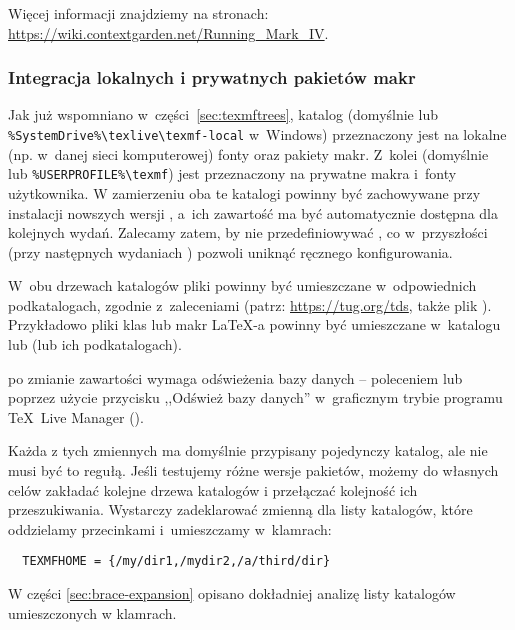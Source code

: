 \documentclass{article}
\begin{document}
Więcej informacji znajdziemy na stronach:
\url{https://wiki.contextgarden.net/Running_Mark_IV}.

\subsubsection{Integracja lokalnych i prywatnych pakietów makr}
\label{sec:local-personal-macros}

Jak już wspomniano w~części~\ref{sec:texmftrees}, katalog 
(domyślnie  lub
\verb|%SystemDrive%\texlive\texmf-local| w~Windows) przeznaczony jest na lokalne
(np. w~danej sieci komputerowej) fonty oraz pakiety makr. Z~kolei
 (domyślnie  lub
\verb|%USERPROFILE%\texmf|) jest przeznaczony na prywatne makra i~fonty
użytkownika. W zamierzeniu oba te katalogi powinny być zachowywane przy
instalacji nowszych wersji \TL{}, a~ich zawartość ma być automatycznie
dostępna dla kolejnych wydań. Zalecamy zatem, by nie
przedefiniowywać , co w~przyszłości (przy następnych wydaniach \TL) pozwoli uniknąć ręcznego konfigurowania.

W~obu drzewach katalogów pliki powinny być umieszczane w~odpowiednich
podkatalogach, zgodnie z~zaleceniami \TDS{} (patrz: \url{https://tug.org/tds},
także  plik ). Przykładowo pliki klas lub
makr \LaTeX-a powinny być umieszczane w~katalogu
 lub 
(lub ich podkatalogach).

 po zmianie zawartości wymaga odświeżenia bazy danych --
poleceniem  lub poprzez użycie przycisku ,,Odśwież bazy
danych'' w~graficznym trybie programu \TeX\ Live Manager ().

Każda z tych zmiennych ma domyślnie przypisany pojedynczy katalog, ale
nie musi być to regułą. Jeśli testujemy różne wersje pakietów, możemy
do własnych celów zakładać kolejne drzewa katalogów i przełączać kolejność
ich przeszukiwania. Wystarczy zadeklarować zmienną 
dla listy katalogów, które oddzielamy przecinkami i~umieszczamy w~klamrach:

\begin{verbatim}
  TEXMFHOME = {/my/dir1,/mydir2,/a/third/dir}
\end{verbatim}

W części \ref{sec:brace-expansion} opisano dokładniej analizę listy
katalogów umieszczonych w klamrach.
\end{document}
